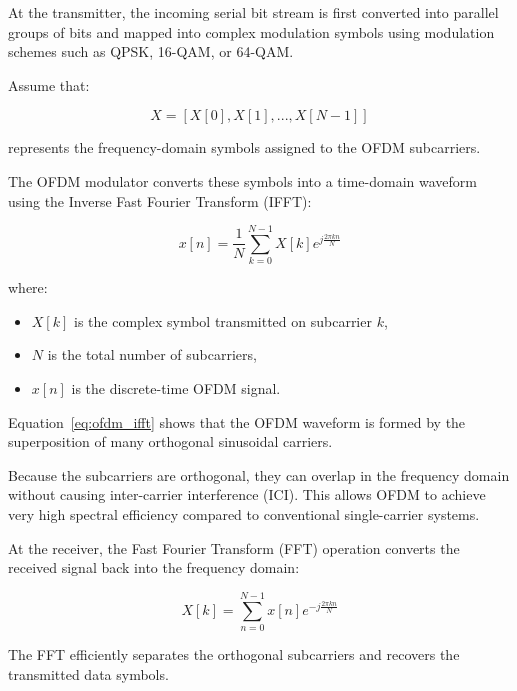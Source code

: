At the transmitter, the incoming serial bit stream is first converted into
parallel groups of bits and mapped into complex modulation symbols using
modulation schemes such as QPSK, 16-QAM, or 64-QAM.

Assume that:

\begin{equation}
X = [X[0],X[1],...,X[N-1]]
\end{equation}

represents the frequency-domain symbols assigned to the OFDM
subcarriers.

The OFDM modulator converts these symbols into a time-domain waveform
using the Inverse Fast Fourier Transform (IFFT):

\begin{equation}
x[n]=\frac{1}{N}\sum_{k=0}^{N-1}X[k]
e^{j\frac{2\pi kn}{N}}
\label{eq:ofdm_ifft}
\end{equation}

where:

\begin{itemize}
    \item $X[k]$ is the complex symbol transmitted on subcarrier $k$,
    \item $N$ is the total number of subcarriers,
    \item $x[n]$ is the discrete-time OFDM signal.
\end{itemize}

Equation~\ref{eq:ofdm_ifft} shows that the OFDM waveform is formed by the
superposition of many orthogonal sinusoidal carriers.

Because the subcarriers are orthogonal, they can overlap in the frequency
domain without causing inter-carrier interference (ICI). This allows OFDM
to achieve very high spectral efficiency compared to conventional
single-carrier systems.

\vspace{0.3cm}

At the receiver, the Fast Fourier Transform (FFT) operation converts the
received signal back into the frequency domain:

\begin{equation}
X[k]=\sum_{n=0}^{N-1}x[n]
e^{-j\frac{2\pi kn}{N}}
\label{eq:ofdm_fft}
\end{equation}

The FFT efficiently separates the orthogonal subcarriers and recovers the
transmitted data symbols.

\vspace{0.3cm}


